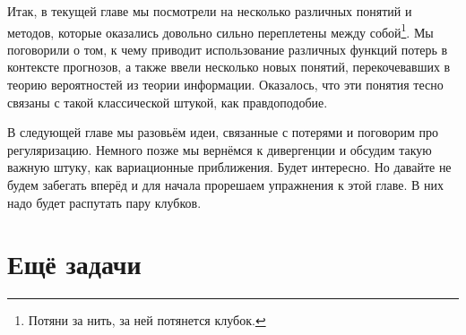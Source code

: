 Итак, в текущей главе мы посмотрели на несколько различных понятий и методов, которые оказались довольно сильно переплетены между собой\footnote{Потяни за нить, за ней потянется клубок.}.  Мы поговорили о том, к чему приводит использование различных функций потерь в контексте прогнозов, а также ввели несколько новых понятий, перекочевавших в теорию вероятностей из теории информации. Оказалось, что эти понятия тесно связаны с такой классической штукой, как правдоподобие. 

В следующей главе мы разовьём идеи, связанные с потерями и поговорим про регуляризацию. Немного позже мы вернёмся к дивергенции и обсудим такую важную штуку, как вариационные приближения. Будет интересно. Но давайте не будем забегать вперёд и для начала прорешаем упражнения к этой главе.  В них надо будет распутать пару клубков. 


\section{Ещё задачи} 

